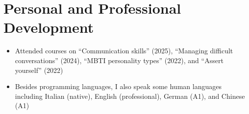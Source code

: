 \documentclass[
	DIV=23,
]{scrartcl}
\begin{document}

\section*{Personal and Professional Development}

\begin{itemize}
	\item Attended courses on \enquote{Communication skills} (2025), \enquote{Managing difficult conversations} (2024), \enquote{MBTI personality types} (2022), and \enquote{Assert yourself} (2022)
	\item Besides programming languages, I also speak some human languages including Italian (native), English (professional), German (A1), and Chinese (A1)
\end{itemize}
\end{document}
